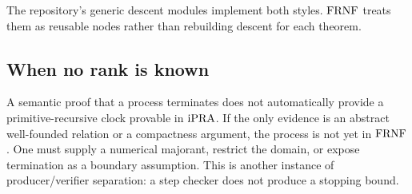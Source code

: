 The repository's generic descent modules implement both styles.  \(\mathrm{FRNF}\) treats them
as reusable nodes rather than rebuilding descent for each theorem.

\subsection{When no rank is known}

A semantic proof that a process terminates does not automatically provide a
primitive-recursive clock provable in \(\mathrm{iPRA}\).  If the only evidence is an abstract
well-founded relation or a compactness argument, the process is not yet in \(\mathrm{FRNF}\).
One must supply a numerical majorant, restrict the domain, or expose termination as a
boundary assumption.  This is another instance of producer/verifier separation: a
step checker does not produce a stopping bound.
